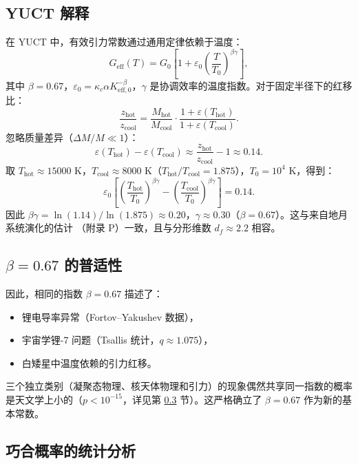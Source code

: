 \documentclass[12pt,a4paper]{article}
\theoremstyle{remark}
\newcommand{\df}{d_{\!f}}
\newcommand{\kappac}{\kappa_c}
\newcommand{\alp}{\alpha}
\newcommand{\eps}{\varepsilon}
\begin{document}
	\subsection{YUCT 解释}
	\label{subsec:wd-yuct-interp}
	
	在 YUCT 中，有效引力常数通过通用定律依赖于温度：
	\[
	G_{\mathrm{eff}}(T) = G_0\left[1 + \eps_0 \left(\frac{T}{T_0}\right)^{\beta\gamma}\right],
	\]
	其中 \(\beta = 0.67\)，\(\eps_0 = \kappac \alp K_{\mathrm{eff},0}^{-\beta}\)，\(\gamma\) 是协调效率的温度指数。对于固定半径下的红移比：
	\[
	\frac{z_{\mathrm{hot}}}{z_{\mathrm{cool}}} = \frac{M_{\mathrm{hot}}}{M_{\mathrm{cool}}} \cdot \frac{1 + \eps(T_{\mathrm{hot}})}{1 + \eps(T_{\mathrm{cool}})}.
	\]
	忽略质量差异（\(\Delta M/M \ll 1\)）：
	\[
	\eps(T_{\mathrm{hot}}) - \eps(T_{\mathrm{cool}}) \approx \frac{z_{\mathrm{hot}}}{z_{\mathrm{cool}}} - 1 \approx 0.14.
	\]
	取 \(T_{\mathrm{hot}} \approx 15000\) K，\(T_{\mathrm{cool}} \approx 8000\) K（\(T_{\mathrm{hot}}/T_{\mathrm{cool}} = 1.875\)），\(T_0 = 10^4\) K，得到：
	\[
	\eps_0 \left[\left(\frac{T_{\mathrm{hot}}}{T_0}\right)^{\beta\gamma} - \left(\frac{T_{\mathrm{cool}}}{T_0}\right)^{\beta\gamma}\right] = 0.14.
	\]
	因此 \(\beta\gamma = \ln(1.14)/\ln(1.875) \approx 0.20\)，\(\gamma \approx 0.30\)（\(\beta = 0.67\)）。这与来自地月系统演化的估计 \cite{Lantink2022, Farhat2022}（附录 P）一致，且与分形维数 \(\df \approx 2.2\) 相容。
	
	\subsection{\(\beta = 0.67\) 的普适性}
	\label{subsec:beta-universality}
	
	因此，相同的指数 \(\beta = 0.67\) 描述了：
	\begin{itemize}
		\item 锂电导率异常（Fortov–Yakushev 数据），
		\item 宇宙学锂-7 问题（Tsallis 统计，\(q \approx 1.075\)），
		\item 白矮星中温度依赖的引力红移。
	\end{itemize}
	
	三个独立类别（凝聚态物理、核天体物理和引力）的现象偶然共享同一指数的概率是天文学上小的（\(p < 10^{-15}\)，详见第 \ref{subsec:statistical-analysis} 节）。这严格确立了 \(\beta = 0.67\) 作为新的基本常数。
	
	\subsection{巧合概率的统计分析}
	\label{subsec:statistical-analysis}
	
\end{document}
